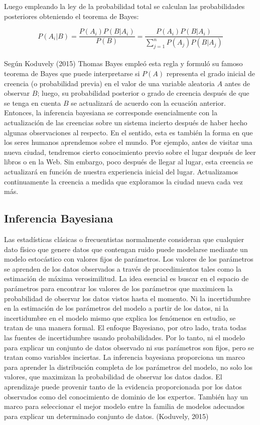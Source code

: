 Luego empleando la ley de la probabilidad total se calculan las probabilidades posteriores obteniendo el teorema de Bayes:

\[P\left(A_{i}|B\right)=
\frac{P\left(A_{i}\right)P\left(B|A_{i}\right)}{P\left(B\right)}=
\frac{P\left(A_{i}\right)P\left(B|A_{i}\right)}{\sum_{j=1}^{n}P\left(A_{j}\right)P\left(B|A_{j}\right)}
\]\\

Según Koduvely (2015) Thomas Bayes empleó esta regla y formuló su famoso teorema de Bayes que puede interpretarse si $P\left(A\right)$ representa el grado inicial de creencia (o probabilidad previa) en el valor de una variable aleatoria $A$ antes de observar $B$; luego, su probabilidad posterior o grado de creencia después de que se tenga en cuenta $B$ se actualizará de acuerdo con la ecuación anterior. Entonces, la inferencia bayesiana se corresponde esencialmente con la actualización de las creencias sobre un sistema incierto después de haber hecho algunas observaciones al respecto. En el sentido, esta es también la forma en que los seres humanos aprendemos sobre el mundo. Por ejemplo, antes de visitar una nueva ciudad, tendremos cierto conocimiento previo sobre el lugar después de leer libros o en la Web. Sin embargo, poco después de llegar al lugar, esta creencia se actualizará en función de nuestra experiencia inicial del lugar. Actualizamos continuamente la creencia a medida que exploramos la ciudad nueva cada vez más.\\

\subsection{Inferencia Bayesiana}

Las estadísticas clásicas o frecuentistas normalmente consideran que cualquier dato físico que genere datos que contengan ruido puede modelarse mediante un modelo estocástico con valores fijos de parámetros. Los valores de los parámetros se aprenden de los datos observados a través de procedimientos tales como la estimación de máxima verosimilitud. La idea esencial es buscar en el espacio de parámetros para encontrar los valores de los parámetros que maximicen la probabilidad de observar los datos vistos hasta el momento. Ni la incertidumbre en la estimación de los parámetros del modelo a partir de los datos, ni la incertidumbre en el modelo mismo que explica los fenómenos en estudio, se tratan de una manera formal. El enfoque Bayesiano, por otro lado, trata todas las fuentes de incertidumbre usando probabilidades. Por lo tanto, ni el modelo para explicar un conjunto de datos observado ni sus parámetros son fijos, pero se tratan como variables inciertas. La inferencia bayesiana proporciona un marco para aprender la distribución completa de los parámetros del modelo, no solo los valores, que maximizan la probabilidad de observar los datos dados. El aprendizaje puede provenir tanto de la evidencia proporcionada por los datos observados como del conocimiento de dominio de los expertos. También hay un marco para seleccionar el mejor modelo entre la familia de modelos adecuados para explicar un determinado conjunto de datos. (Koduvely, 2015)


